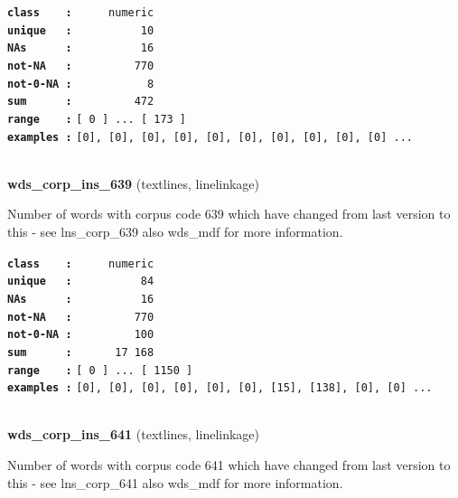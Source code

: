 \documentclass[]{article}
\begin{document}
\textbf{\texttt{class\ \ \ \ :}} \texttt{~~~~~numeric}\\
\textbf{\texttt{unique\ \ \ :}} \texttt{~~~~~~~~~~10}\\
\textbf{\texttt{NAs\ \ \ \ \ \ :}} \texttt{~~~~~~~~~~16}\\
\textbf{\texttt{not-NA\ \ \ :}} \texttt{~~~~~~~~~770}\\
\textbf{\texttt{not-0-NA\ :}} \texttt{~~~~~~~~~~~8}\\
\textbf{\texttt{sum\ \ \ \ \ \ :}} \texttt{~~~~~~~~~472}\\
\textbf{\texttt{range\ \ \ \ :}}
\texttt{{[}\ 0\ {]}\ ...\ {[}\ 173\ {]}}\\
\textbf{\texttt{examples\ :}}
\texttt{{[}0{]},\ {[}0{]},\ {[}0{]},\ {[}0{]},\ {[}0{]},\ {[}0{]},\ {[}0{]},\ {[}0{]},\ {[}0{]},\ {[}0{]}\ ...}\\

~

\textbf{wds\_corp\_ins\_639} (textlines, linelinkage)

Number of words with corpus code 639 which have changed from last
version to this - see lns\_corp\_639 also wds\_mdf for more information.

\textbf{\texttt{class\ \ \ \ :}} \texttt{~~~~~numeric}\\
\textbf{\texttt{unique\ \ \ :}} \texttt{~~~~~~~~~~84}\\
\textbf{\texttt{NAs\ \ \ \ \ \ :}} \texttt{~~~~~~~~~~16}\\
\textbf{\texttt{not-NA\ \ \ :}} \texttt{~~~~~~~~~770}\\
\textbf{\texttt{not-0-NA\ :}} \texttt{~~~~~~~~~100}\\
\textbf{\texttt{sum\ \ \ \ \ \ :}} \texttt{~~~~~~17~168}\\
\textbf{\texttt{range\ \ \ \ :}}
\texttt{{[}\ 0\ {]}\ ...\ {[}\ 1150\ {]}}\\
\textbf{\texttt{examples\ :}}
\texttt{{[}0{]},\ {[}0{]},\ {[}0{]},\ {[}0{]},\ {[}0{]},\ {[}0{]},\ {[}15{]},\ {[}138{]},\ {[}0{]},\ {[}0{]}\ ...}\\

~

\textbf{wds\_corp\_ins\_641} (textlines, linelinkage)

Number of words with corpus code 641 which have changed from last
version to this - see lns\_corp\_641 also wds\_mdf for more information.
\end{document}
